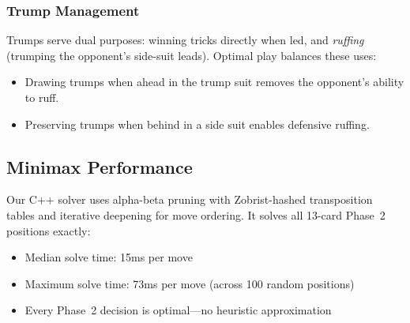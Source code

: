 \subsubsection{Trump Management}

Trumps serve dual purposes: winning tricks directly when led, and
\emph{ruffing} (trumping the opponent's side-suit leads). Optimal play
balances these uses:
\begin{itemize}
  \item Drawing trumps when ahead in the trump suit removes the opponent's
    ability to ruff.
  \item Preserving trumps when behind in a side suit enables defensive
    ruffing.
\end{itemize}

\subsection{Minimax Performance}

Our C++ solver uses alpha-beta pruning with Zobrist-hashed transposition
tables and iterative deepening for move ordering. It solves all 13-card
Phase~2 positions exactly:
\begin{itemize}
  \item Median solve time: 15ms per move
  \item Maximum solve time: 73ms per move (across 100 random positions)
  \item Every Phase~2 decision is optimal---no heuristic approximation
\end{itemize}
